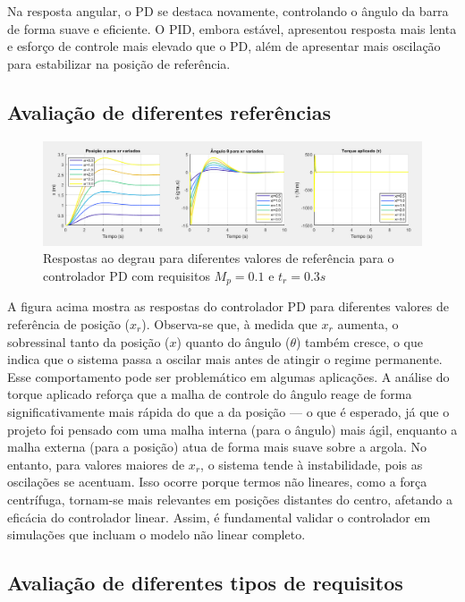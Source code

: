 \documentclass[a4paper, 12pt]{article} %
\begin{document}
Na resposta angular, o PD se destaca novamente, controlando o ângulo da barra de forma suave e eficiente. O PID, embora estável, apresentou resposta mais lenta e esforço de controle mais elevado que o PD, além de apresentar mais oscilação para estabilizar na posição de referência.

\subsection{Avaliação de diferentes referências}

\begin{figure}[H]
    \centering
    \includegraphics[width=1.0\textwidth]{images/teste_xr_PD_tr_3.0_Mp_0.1.png}
    \caption{\centering Respostas ao degrau para diferentes valores de referência para o controlador PD com requisitos $M_p=0.1$ e $t_r=0.3s$}
    \label{fig:resultado-controladores}
\end{figure}

A figura acima mostra as respostas do controlador PD para diferentes valores de referência de posição ($x_r$). Observa-se que, à medida que $x_r$ aumenta, o sobressinal tanto da posição ($x$) quanto do ângulo ($\theta$) também cresce, o que indica que o sistema passa a oscilar mais antes de atingir o regime permanente. Esse comportamento pode ser problemático em algumas aplicações. A análise do torque aplicado reforça que a malha de controle do ângulo reage de forma significativamente mais rápida do que a da posição — o que é esperado, já que o projeto foi pensado com uma malha interna (para o ângulo) mais ágil, enquanto a malha externa (para a posição) atua de forma mais suave sobre a argola. No entanto, para valores maiores de $x_r$, o sistema tende à instabilidade, pois as oscilações se acentuam. Isso ocorre porque termos não lineares, como a força centrífuga, tornam-se mais relevantes em posições distantes do centro, afetando a eficácia do controlador linear. Assim, é fundamental validar o controlador em simulações que incluam o modelo não linear completo.


\subsection{Avaliação de diferentes tipos de requisitos}
\end{document}
